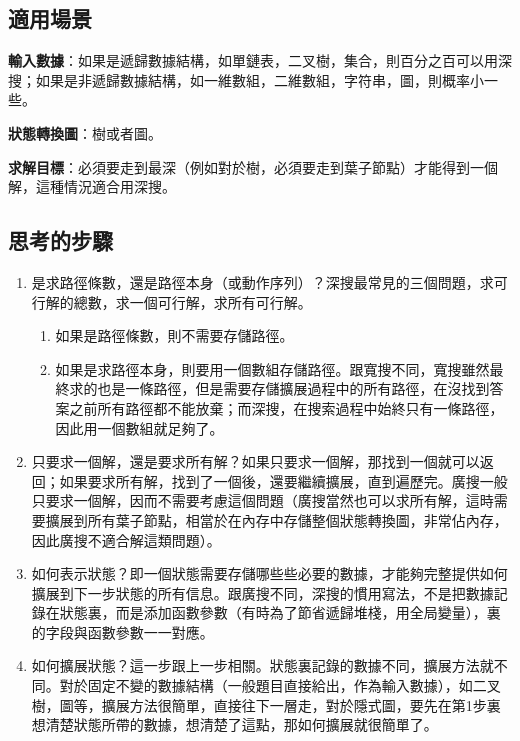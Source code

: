 \subsection{適用場景}

\textbf{輸入數據}：如果是遞歸數據結構，如單鏈表，二叉樹，集合，則百分之百可以用深搜；如果是非遞歸數據結構，如一維數組，二維數組，字符串，圖，則概率小一些。

\textbf{狀態轉換圖}：樹或者圖。

\textbf{求解目標}：必須要走到最深（例如對於樹，必須要走到葉子節點）才能得到一個解，這種情況適合用深搜。


\subsection{思考的步驟}
\begin{enumerate}
\item 是求路徑條數，還是路徑本身（或動作序列）？深搜最常見的三個問題，求可行解的總數，求一個可行解，求所有可行解。
    \begin{enumerate}
	\item 如果是路徑條數，則不需要存儲路徑。
    \item 如果是求路徑本身，則要用一個數組存儲路徑。跟寬搜不同，寬搜雖然最終求的也是一條路徑，但是需要存儲擴展過程中的所有路徑，在沒找到答案之前所有路徑都不能放棄；而深搜，在搜索過程中始終只有一條路徑，因此用一個數組就足夠了。
    \end{enumerate}

\item 只要求一個解，還是要求所有解？如果只要求一個解，那找到一個就可以返回；如果要求所有解，找到了一個後，還要繼續擴展，直到遍歷完。廣搜一般只要求一個解，因而不需要考慮這個問題（廣搜當然也可以求所有解，這時需要擴展到所有葉子節點，相當於在內存中存儲整個狀態轉換圖，非常佔內存，因此廣搜不適合解這類問題）。

\item 如何表示狀態？即一個狀態需要存儲哪些些必要的數據，才能夠完整提供如何擴展到下一步狀態的所有信息。跟廣搜不同，深搜的慣用寫法，不是把數據記錄在狀態裏，而是添加函數參數（有時為了節省遞歸堆棧，用全局變量），裏的字段與函數參數一一對應。

\item 如何擴展狀態？這一步跟上一步相關。狀態裏記錄的數據不同，擴展方法就不同。對於固定不變的數據結構（一般題目直接給出，作為輸入數據），如二叉樹，圖等，擴展方法很簡單，直接往下一層走，對於隱式圖，要先在第1步裏想清楚狀態所帶的數據，想清楚了這點，那如何擴展就很簡單了。


\end{enumerate}
